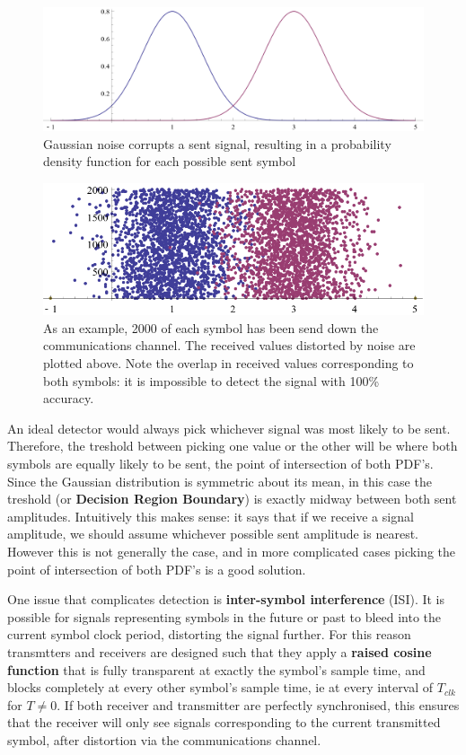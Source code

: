 \begin{figure}[htbp]
\centering
\includegraphics{4-PAM_PDF.png}
\caption{Gaussian noise corrupts a sent signal, resulting in a
probability density function for each possible sent symbol}
\end{figure}

\begin{figure}[htbp]
\centering
\includegraphics{4-PAM_samples.png}
\caption{As an example, 2000 of each symbol has been send down the
communications channel. The received values distorted by noise are
plotted above. Note the overlap in received values corresponding to both
symbols: it is impossible to detect the signal with 100\% accuracy.}
\end{figure}

An ideal detector would always pick whichever signal was most likely to
be sent. Therefore, the treshold between picking one value or the other
will be where both symbols are equally likely to be sent, the point of
intersection of both PDF's. Since the Gaussian distribution is symmetric
about its mean, in this case the treshold (or \textbf{Decision Region
Boundary}) is exactly midway between both sent amplitudes. Intuitively
this makes sense: it says that if we receive a signal amplitude, we
should assume whichever possible sent amplitude is nearest. However this
is not generally the case, and in more complicated cases picking the
point of intersection of both PDF's is a good solution.

One issue that complicates detection is \textbf{inter-symbol
interference} (ISI). It is possible for signals representing symbols in
the future or past to bleed into the current symbol clock period,
distorting the signal further. For this reason transmtters and receivers
are designed such that they apply a \textbf{raised cosine function} that
is fully transparent at exactly the symbol's sample time, and blocks
completely at every other symbol's sample time, ie at every interval of
$T_{clk}$ for $T \neq 0$. If both receiver and transmitter are perfectly
synchronised, this ensures that the receiver will only see signals
corresponding to the current transmitted symbol, after distortion via
the communications channel.

